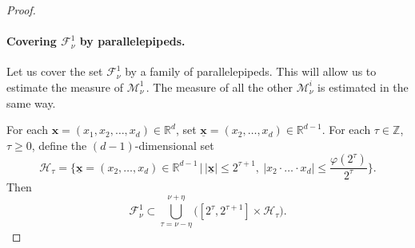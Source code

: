 \documentclass[a4paper,12pt]{article}
\theoremstyle{definition}
\theoremstyle{remark}
\theoremstyle{plain}
\renewcommand{\vec}[1]{\mathbf{#1}}
\renewcommand{\geq}{\geqslant}
\renewcommand{\leq}{\leqslant}
\newcommand{\R}{\mathbb{R}}
\newcommand{\Z}{\mathbb{Z}}
\newcommand{\cF}{\mathcal{F}}
\newcommand{\cH}{\mathcal{H}}
\newcommand{\cM}{\mathcal{M}}
\begin{document}
\begin{proof}
  \paragraph{Covering $\cF^1_\nu$ by parallelepipeds.}
  
  Let us cover the set $\cF^1_\nu$ by a family of paralle\-le\-pi\-peds. This will allow us to estimate the measure of $\cM^1_\nu$\,. The measure of all the other $\cM^i_\nu$ is estimated in the same way.

  For each $\vec x=(x_1,x_2,\ldots,x_d)\in\R^d$, set $\underline{\vec x}=(x_2,\ldots,x_d)\in\R^{d-1}$.
  For each $\tau\in\Z$, $\tau\geq0$, define the $(d-1)$-dimensional set
  \[
    \cH_\tau=\Big\{\underline{\vec x}=(x_2,\ldots,x_d)\in\R^{d-1} \,\Big|\, |\underline{\vec x}|\leq2^{\tau+1},\ 
                                                                            |x_2\cdot\ldots\cdot x_d|\leq\frac{\varphi(2^\tau)}{2^\tau} \Big\}.
  \]
  Then 
  \begin{equation}\label{eq:F_1_nu_hyperbolic_covering}
    \cF^1_\nu\subset\bigcup_{\tau=\nu-\eta}^{\nu+\eta}\Big([2^\tau,2^{\tau+1}]\times\cH_\tau\Big).
  \end{equation}


\end{proof}
\end{document}
